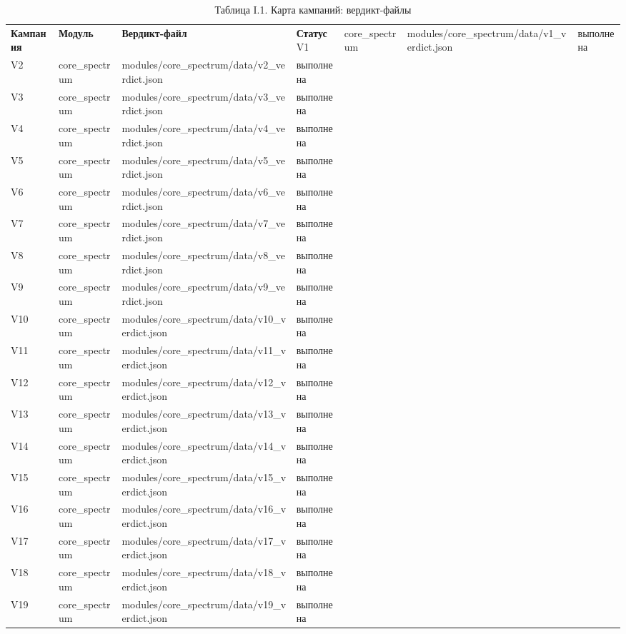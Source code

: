 \documentclass[11pt,a4paper]{article}
\begin{document}
\begin{table}[htbp]\centering\small
\caption{Таблица I.1. Карта кампаний: вердикт-файлы}
\begin{tabular}{p{} p{} p{} p{}}
\toprule
\textbf{Кампания} & \textbf{Модуль} & \textbf{Вердикт-файл} & \textbf{Статус}
\midrule
V1 & core\_spectrum & modules/core\_spectrum/data/v1\_verdict.json & выполнена \\
V2 & core\_spectrum & modules/core\_spectrum/data/v2\_verdict.json & выполнена \\
V3 & core\_spectrum & modules/core\_spectrum/data/v3\_verdict.json & выполнена \\
V4 & core\_spectrum & modules/core\_spectrum/data/v4\_verdict.json & выполнена \\
V5 & core\_spectrum & modules/core\_spectrum/data/v5\_verdict.json & выполнена \\
V6 & core\_spectrum & modules/core\_spectrum/data/v6\_verdict.json & выполнена \\
V7 & core\_spectrum & modules/core\_spectrum/data/v7\_verdict.json & выполнена \\
V8 & core\_spectrum & modules/core\_spectrum/data/v8\_verdict.json & выполнена \\
V9 & core\_spectrum & modules/core\_spectrum/data/v9\_verdict.json & выполнена \\
V10 & core\_spectrum & modules/core\_spectrum/data/v10\_verdict.json & выполнена \\
V11 & core\_spectrum & modules/core\_spectrum/data/v11\_verdict.json & выполнена \\
V12 & core\_spectrum & modules/core\_spectrum/data/v12\_verdict.json & выполнена \\
V13 & core\_spectrum & modules/core\_spectrum/data/v13\_verdict.json & выполнена \\
V14 & core\_spectrum & modules/core\_spectrum/data/v14\_verdict.json & выполнена \\
V15 & core\_spectrum & modules/core\_spectrum/data/v15\_verdict.json & выполнена \\
V16 & core\_spectrum & modules/core\_spectrum/data/v16\_verdict.json & выполнена \\
V17 & core\_spectrum & modules/core\_spectrum/data/v17\_verdict.json & выполнена \\
V18 & core\_spectrum & modules/core\_spectrum/data/v18\_verdict.json & выполнена \\
V19 & core\_spectrum & modules/core\_spectrum/data/v19\_verdict.json & выполнена \\

\end{tabular}
\end{table}
\end{document}

